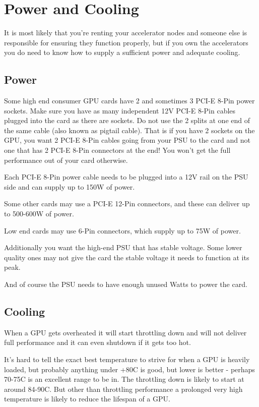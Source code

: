 \documentclass[
]{report}
\begin{document}
\section{Power and Cooling}\label{power-and-cooling}

It is most likely that you're renting your accelerator nodes and someone
else is responsible for ensuring they function properly, but if you own
the accelerators you do need to know how to supply a sufficient power
and adequate cooling.

\subsection{Power}\label{power}

Some high end consumer GPU cards have 2 and sometimes 3 PCI-E 8-Pin
power sockets. Make sure you have as many independent 12V PCI-E 8-Pin
cables plugged into the card as there are sockets. Do not use the 2
splits at one end of the same cable (also known as pigtail cable). That
is if you have 2 sockets on the GPU, you want 2 PCI-E 8-Pin cables going
from your PSU to the card and not one that has 2 PCI-E 8-Pin connectors
at the end! You won't get the full performance out of your card
otherwise.

Each PCI-E 8-Pin power cable needs to be plugged into a 12V rail on the
PSU side and can supply up to 150W of power.

Some other cards may use a PCI-E 12-Pin connectors, and these can
deliver up to 500-600W of power.

Low end cards may use 6-Pin connectors, which supply up to 75W of power.

Additionally you want the high-end PSU that has stable voltage. Some
lower quality ones may not give the card the stable voltage it needs to
function at its peak.

And of course the PSU needs to have enough unused Watts to power the
card.

\subsection{Cooling}\label{cooling}

When a GPU gets overheated it will start throttling down and will not
deliver full performance and it can even shutdown if it gets too hot.

It's hard to tell the exact best temperature to strive for when a GPU is
heavily loaded, but probably anything under +80C is good, but lower is
better - perhaps 70-75C is an excellent range to be in. The throttling
down is likely to start at around 84-90C. But other than throttling
performance a prolonged very high temperature is likely to reduce the
lifespan of a GPU.
\end{document}
